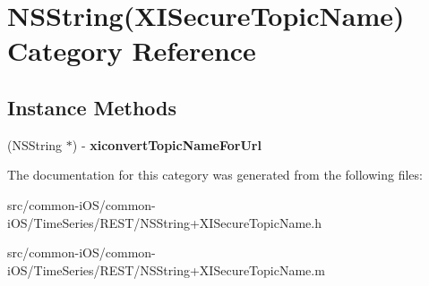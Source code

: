 \hypertarget{category_n_s_string_07_x_i_secure_topic_name_08}{}\section{N\+S\+String(X\+I\+Secure\+Topic\+Name) Category Reference}
\label{category_n_s_string_07_x_i_secure_topic_name_08}
\subsection*{Instance Methods}
\begin{DoxyCompactItemize}
\item 
\hypertarget{category_n_s_string_07_x_i_secure_topic_name_08_a14d8a073b8860acf580fb4a500dacb2e}{}\label{category_n_s_string_07_x_i_secure_topic_name_08_a14d8a073b8860acf580fb4a500dacb2e} 
(N\+S\+String $\ast$) -\/ {\bfseries xiconvert\+Topic\+Name\+For\+Url}
\end{DoxyCompactItemize}


The documentation for this category was generated from the following files\+:\begin{DoxyCompactItemize}
\item 
src/common-\/i\+O\+S/common-\/i\+O\+S/\+Time\+Series/\+R\+E\+S\+T/N\+S\+String+\+X\+I\+Secure\+Topic\+Name.\+h\item 
src/common-\/i\+O\+S/common-\/i\+O\+S/\+Time\+Series/\+R\+E\+S\+T/N\+S\+String+\+X\+I\+Secure\+Topic\+Name.\+m\end{DoxyCompactItemize}
